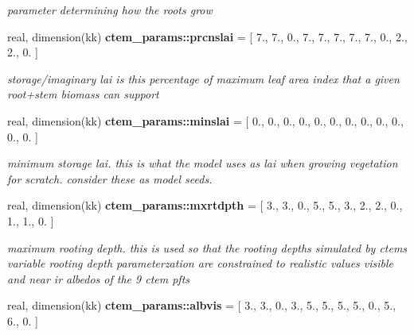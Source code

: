 \begin{DoxyCompactItemize}
\begin{DoxyCompactList}\small\item\em parameter determining how the roots grow \end{DoxyCompactList}\item 
\hypertarget{namespacectem__params_a2bc170a6ee30f73dba8ce44297493550}{}real, dimension(kk) {\bfseries ctem\+\_\+params\+::prcnslai} = \mbox{[} 7., 7., 0., 7., 7., 7., 7., 7., 0., 2., 2., 0. \mbox{]}\label{namespacectem__params_a2bc170a6ee30f73dba8ce44297493550}

\begin{DoxyCompactList}\small\item\em storage/imaginary lai is this percentage of maximum leaf area index that a given root+stem biomass can support \end{DoxyCompactList}\item 
\hypertarget{namespacectem__params_af7fddd21a0baea756dfde3683a67ec83}{}real, dimension(kk) {\bfseries ctem\+\_\+params\+::minslai} = \mbox{[} 0., 0., 0., 0., 0., 0., 0., 0., 0., 0., 0., 0. \mbox{]}\label{namespacectem__params_af7fddd21a0baea756dfde3683a67ec83}

\begin{DoxyCompactList}\small\item\em minimum storage lai. this is what the model uses as lai when growing vegetation for scratch. consider these as model seeds. \end{DoxyCompactList}\item 
\hypertarget{namespacectem__params_aa04ff0cae9a12857edb2bced344e57eb}{}real, dimension(kk) {\bfseries ctem\+\_\+params\+::mxrtdpth} = \mbox{[} 3., 3., 0., 5., 5., 3., 2., 2., 0., 1., 1., 0. \mbox{]}\label{namespacectem__params_aa04ff0cae9a12857edb2bced344e57eb}

\begin{DoxyCompactList}\small\item\em maximum rooting depth. this is used so that the rooting depths simulated by ctem\textquotesingle{}s variable rooting depth parameterzation are constrained to realistic values visible and near ir albedos of the 9 ctem pfts \end{DoxyCompactList}\item 
\hypertarget{namespacectem__params_a31818df48fa008f61e322e702577c978}{}real, dimension(kk) {\bfseries ctem\+\_\+params\+::albvis} = \mbox{[} 3., 3., 0., 3., 5., 5., 5., 5., 0., 5., 6., 0. \mbox{]}\label{namespacectem__params_a31818df48fa008f61e322e702577c978}


\end{DoxyCompactItemize}
